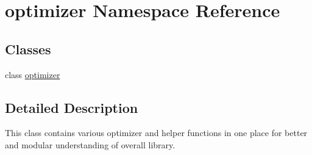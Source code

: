 \hypertarget{namespaceoptimizer}{}\section{optimizer Namespace Reference}
\label{namespaceoptimizer}
\subsection*{Classes}
\begin{DoxyCompactItemize}
\item 
class \mbox{\hyperlink{classoptimizer_1_1optimizer}{optimizer}}
\end{DoxyCompactItemize}


\subsection{Detailed Description}
\begin{DoxyVerb}This class contains various optimizer and helper functions in one place for better and modular understanding of overall 
library.
\end{DoxyVerb}
 